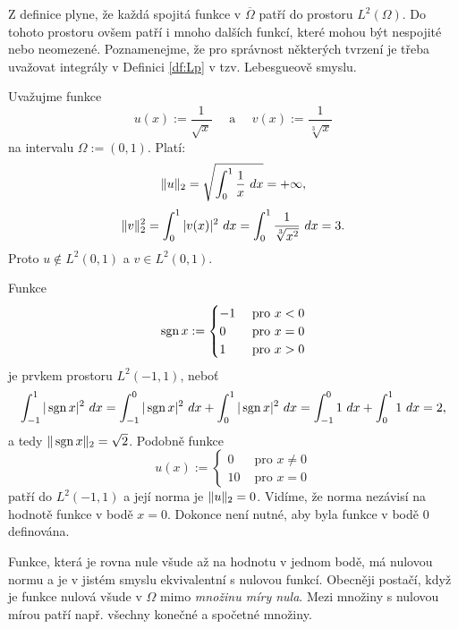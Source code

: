 Z definice plyne, že každá spojitá funkce v $\overline\Omega$ patří do prostoru $L^2(\Omega)$.
Do tohoto prostoru ovšem patří i mnoho dalších funkcí, které mohou být nespojité nebo neomezené.
Poznamenejme, že pro správnost některých tvrzení je třeba uvažovat integrály v Definici \ref{df:Lp} v tzv. Lebesgueově smyslu.


\begin{ex}
Uvažujme funkce
\[ u(x) := \frac1{\sqrt{x}} \quad\mbox{ a }\quad v(x) := \frac1{\sqrt[3]{x}} \]
na intervalu $\Omega:=(0,1)$.
Platí:
\[ \|u\|_2 = \sqrt{\int_0^1 \frac1x~dx} = +\infty, \]
\[ \|v\|_2^2 = \int_0^1 |v(x)|^2~dx = \int_0^1 \frac1{\sqrt[3]{x^2}}~dx = 3. \]
Proto $u\notin L^2(0,1)$ a $v\in L^2(0,1)$.
\end{ex}

\begin{ex}
Funkce
\[ \operatorname{sgn} x:=\begin{cases}-1 & \mbox{ pro }x<0\\0 & \mbox{ pro }x=0\\1 & \mbox{ pro }x>0\end{cases} \]
je prvkem prostoru $L^2(-1,1)$, neboť
\[ \int_{-1}^1 |\operatorname{sgn} x|^2~dx = \int_{-1}^0 |\operatorname{sgn} x|^2 ~dx + \int_0^1 |\operatorname{sgn} x|^2~dx = \int_{-1}^0 1~dx + \int_0^1 1~dx = 2, \]
a tedy $\|\operatorname{sgn} x\|_2 = \sqrt{2}$.
Podobně funkce
\[ u(x) := \begin{cases}0 & \mbox{ pro }x\neq 0\\10 & \mbox{ pro }x=0\end{cases} \]
patří do $L^2(-1,1)$ a její norma je $\|u\|_2=0$.
Vidíme, že norma nezávisí na hodnotě funkce v bodě $x=0$. Dokonce není nutné, aby byla funkce v bodě 0 definována.
\end{ex}

Funkce, která je rovna nule všude až na hodnotu v jednom bodě, má nulovou normu a je v jistém smyslu ekvivalentní s nulovou funkcí.
Obecněji postačí, když je funkce nulová všude v $\Omega$ mimo \emph{množinu míry nula}.
Mezi množiny s nulovou mírou patří např. všechny konečné a spočetné množiny.

